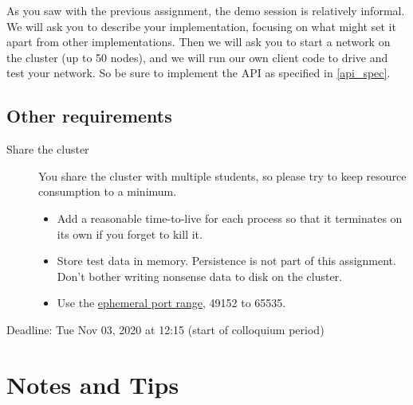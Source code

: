 \documentclass[]{article}
\def\deadline{Tue Nov 03, 2020 at 12:15 (start of colloquium period)}
\begin{document}
As you saw with the previous assignment, the demo session is relatively informal.
We will ask you to describe your implementation,
focusing on what might set it apart from other implementations.
Then we will ask you to start a network on the cluster (up to 50 nodes),
and we will run our own client code to drive and test your network.
So be sure to implement the API as specified in \autoref{api_spec}.

\subsection{Other requirements}

\begin{description}

    \item[Share the cluster]

        You share the cluster with multiple students, so please try to keep resource
        consumption to a minimum.

        \begin{itemize}
            \item Add a reasonable time-to-live for each process so that it terminates on its own if you forget to kill it.
            \item Store test data in memory. Persistence is not part of this assignment.
                Don't bother writing nonsense data to disk on the cluster.
            \item Use the \href{https://en.wikipedia.org/wiki/Ephemeral_port}{ephemeral port range}, 49152 to 65535.
        \end{itemize}

    \item[Deadline: \deadline{}]

\end{description}

\section{Notes and Tips}
\end{document}
